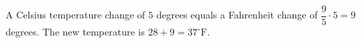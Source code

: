 A Celsius temperature change of $5$ degrees equals a Fahrenheit change of $\dfrac{9}{5}\cdot5=9$ degrees. The new temperature is $28+9=\boxed{37^\circ\mathrm F}$.
